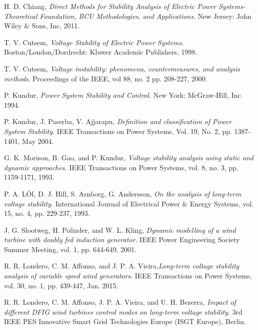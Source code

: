 \documentclass[journal]{IEEEtran}
\begin{document}
\begin{thebibliography}{1}

H. D. Chiang, {\em Direct Methods for Stability Analysis of Electric Power Systems-Theoretical Foundation, BCU Methodologies, and Applications}.
\newblock New Jersey: John Wiley \& Sons, Inc, 2011.

T. V. Cutsem, {\em Voltage Stability of Electric Power Systems}.
\newblock Boston/London/Dordrecht: Kluwer Academic Publishers, 1998.

T. V. Cutsem, {\em Voltage instability: phenomena, countermeasures, and analysis methods}.
\newblock Proceedings of the IEEE, vol 88, no. 2 pp. 208-227, 2000.

P. Kundur, {\em Power System Stability and Control}.
\newblock New York: McGraw-Hill, Inc. 1994.

P. Kundur, J. Paserba, V. Ajjarapu, {\em Definition and classification of Power System Stability}.
\newblock IEEE Transactions on Power Systems, Vol. 19, No. 2, pp. 1387-1401, May 2004.

G. K. Morison, B. Gao, and P. Kundur, {\em Voltage stability analysis using static and dynamic approaches.}
\newblock IEEE Transactions on Power Systems, vol. 8, no. 3, pp. 1159-1171, 1993.

P. A. LÖf, D. J. Hill, S. Arnborg, G. Andersson, {\em On the analysis of long-term voltage stability.} \newblock International Journal of Electrical Power \& Energy Systems, vol. 15, no. 4, pp. 229-237, 1993.

J. G. Slootweg, H. Polinder, and W. L. Kling, {\em Dynamic modelling of a wind turbine with doubly fed induction generator.}
\newblock IEEE Power Engineering Society Summer Meeting, vol. 1, pp. 644-649, 2001.




R. R. Londero, C. M. Affonso, and J. P. A. Vieira,{\em Long-term voltage stability analysis of variable speed wind generators}.
\newblock IEEE Transactions on Power Systems, vol. 30, no. 1, pp. 439-447, Jan. 2015.

R. R. Londero, C. M. Affonso, J. P. A. Vieira, and U. H. Bezerra, {\em Impact of different DFIG wind turbines control modes on long-term voltage stability}.
 3rd IEEE PES Innovative Smart Grid Technologies Europe (ISGT Europe), Berlin.



\end{thebibliography}
\end{document}
